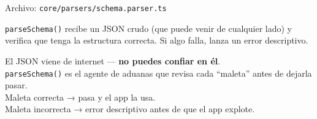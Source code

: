 \documentclass[12pt, a4paper]{article}
\begin{document}
Archivo: \textcolor{morado}{\texttt{core/parsers/schema.parser.ts}}

\texttt{parseSchema()} recibe un JSON crudo (que puede venir de cualquier lado) y verifica
que tenga la estructura correcta. Si algo falla, lanza un error descriptivo.

\begin{tcolorbox}[analogia, title={\emoji{customs} \emoji{police-officer} El Agente de Aduanas}]
  El JSON viene de internet --- \textbf{no puedes confiar en él}.\\
  \texttt{parseSchema()} es el agente de aduanas que revisa cada ``maleta'' antes de dejarla pasar.\\[0.3cm]
  Maleta correcta  → pasa y el app la usa.\\
  Maleta incorrecta  → error descriptivo antes de que el app explote.
\end{tcolorbox}
\end{document}
